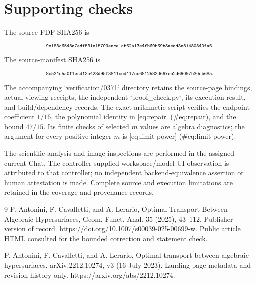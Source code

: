 \documentclass[10pt]{article}
\begin{document}
\section*{Supporting checks}
The source PDF SHA256 is \[\text{\texttt{\scriptsize 9e183c6543a7edf531e15709eece1ab62a13e4fb60b69b8aead3e31480840fa6}}.\] The source-manifest SHA256 is \[\text{\texttt{\scriptsize 8c534e5a0f1ecd13a428d95f3841ced417ec6812583d667eb2d69097b30cb685}}.\] The accompanying `verification/0371` directory retains the source-page bindings, actual viewing receipts, the independent `proof\_check.py`, its execution result, and build/dependency records. The exact-arithmetic script verifies the endpoint coefficient \(1/16\), the polynomial identity in [eq:repair] (\#eq:repair), and the bound \(47/15\). Its finite checks of selected \(m\) values are algebra diagnostics; the argument for every positive integer \(m\) is [eq:limit-power] (\#eq:limit-power).\par
The scientific analysis and image inspections are performed in the assigned current Chat. The controller-supplied workspace/model UI observation is attributed to that controller; no independent backend-equivalence assertion or human attestation is made. Complete source and execution limitations are retained in the coverage and provenance records.\par
9 P. Antonini, F. Cavalletti, and A. Lerario, Optimal Transport Between Algebraic Hypersurfaces, Geom. Funct. Anal. 35 (2025), 43–112. Publisher version of record. https://doi.org/10.1007/s00039-025-00699-w. Public article HTML consulted for the bounded correction and statement check.\par
P. Antonini, F. Cavalletti, and A. Lerario, Optimal transport between algebraic hypersurfaces, arXiv:2212.10274, v3 (16 July 2023). Landing-page metadata and revision history only. https://arxiv.org/abs/2212.10274.\par
\end{document}
